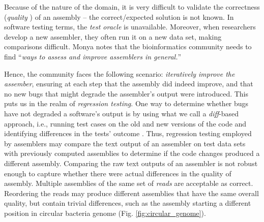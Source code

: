 Because of the nature of the domain, it is very difficult to validate the
correctness ({\it quality} \cite{monya2012}) of an assembly -- the
correct/expected solution is not known.  In software testing terms, the {\it
test oracle} is unavailable.
Moreover, when researchers develop a new
assembler, they often run it on a new data set, making comparisons difficult.
Monya \cite{monya2012} notes that the bioinformatics community needs to find
``{\it ways to assess and improve assemblers in general.}''

Hence, the community faces the following scenario: {\it iteratively improve
the assember}, ensuring at each step that the assembly did indeed improve, and
that no new bugs that might degrade the assembler's output were introduced.
This puts us in the realm of {\it regression testing}.  One way to determine
whether bugs have not degraded a software's output is by using what we call a
{\it diff}-based approach, i.e., running test cases on the old and new versions
of the code and identifying differences in the tests' outcome
\cite{Orso:2008:BBR:1401827.1401835}.  Thus, regression testing employed by
assemblers may compare the text output of an assembler on test data sets with
previously computed assemblies to determine if the code changes produced a
different assembly.  Comparing the raw text outputs of an assembler is not
robust enough to capture whether there were actual differences in the quality
of assembly. Multiple assemblies of the same set of \emph{reads} are acceptable as correct. Reordering the reads may produce different
assemblies that have the same overall quality, but contain trivial differences,
such as the assembly starting a different position in circular bacteria genome (Fig. \ref{fig:circular_genome}).


